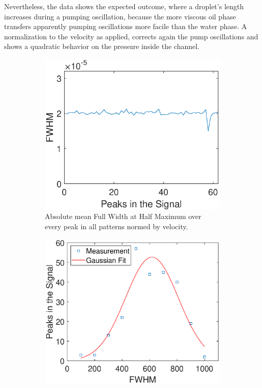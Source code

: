 Nevertheless, the data shows the expected outcome, where a droplet's length increases during a pumping oscillation, because the more viscous oil phase transfers apparently pumping oscillations more facile than the water phase. A normalization to the velocity as applied, corrects again the pump oscillations and shows a quadratic behavior on the pressure inside the channel.

\begin{figure}[h!]
	\begin{subfigure}[l]{0.49\textwidth} 
		\centering
		\includegraphics[clip,trim={0mm 0mm 0mm 0mm}, width=1\linewidth]{Ressourcen/Results/Measurement/FWHM_abs}
		\caption{Absolute mean Full Width at Half Maximum over every peak in all patterns normed by velocity.}
		\label{fig:exp:pattern:FWHM:abs}
	\end{subfigure}
	\hfill
	\begin{subfigure}[r]{0.49\textwidth} 
		\centering
		\includegraphics[clip,trim={0mm 0mm 0mm 0mm}, width=1\linewidth]{Ressourcen/Results/Measurement/FWHM_hist}

\end{subfigure}
\end{figure}
